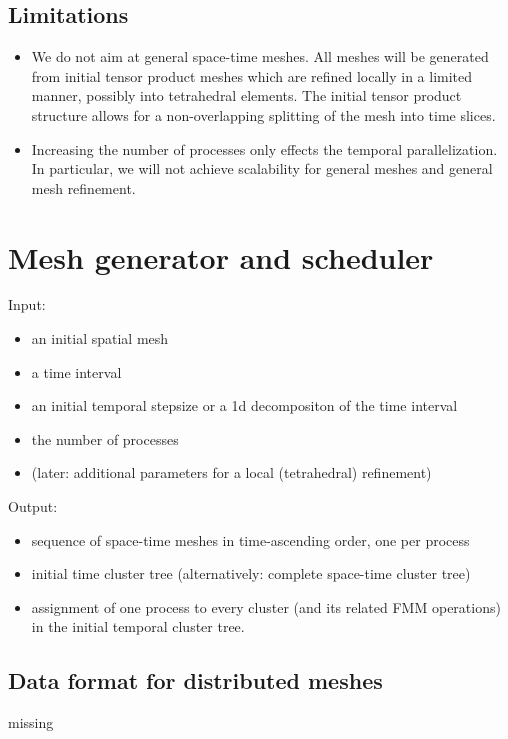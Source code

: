 \documentclass[a4paper,11pt]{article}
\theoremstyle{plain}
\theoremstyle{definition}
\theoremstyle{remark}
\begin{document}
\subsection{Limitations}
\begin{itemize}
  \item  We do not aim at general space-time meshes. All meshes will be generated from initial tensor product meshes which are refined locally in a limited manner, possibly into tetrahedral elements. The initial tensor product structure allows for a non-overlapping splitting of the mesh into time slices.
  \item Increasing the number of processes only effects the temporal parallelization. In particular, we will not 
  achieve scalability for general meshes and general mesh refinement.
\end{itemize}

\section{Mesh generator and scheduler}

Input:
\begin{itemize}
  \item an initial spatial mesh
  \item a time interval
  \item an initial temporal stepsize or a 1d decompositon of the time interval
  \item the number of processes
  \item (later: additional parameters for a local (tetrahedral) refinement)
\end{itemize}
Output:
\begin{itemize}
  \item sequence of space-time meshes in time-ascending order, one per process
  \item initial time cluster tree (alternatively: complete space-time cluster tree)
  \item assignment of one process to every cluster (and its related FMM operations) in the initial temporal cluster tree.
\end{itemize}

\subsection{Data format for distributed meshes }
missing
\end{document}
